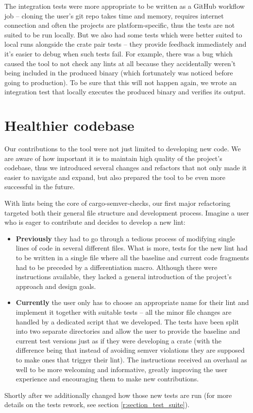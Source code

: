 \documentclass[licencjacka,en]{pracamgr}
\begin{document}
The integration tests were more appropriate to be written as a GitHub workflow job
-- cloning the user's git repo takes time and memory, requires internet connection
and often the projects are platform-specific,
thus the tests are not suited to be run locally.
But we also had some tests which were better suited to local runs alongside the crate pair tests
-- they provide feedback immediately and it's easier to debug when such tests fail.
For example, there was a bug which caused the tool to not check any lints at all
because they accidentally weren't being included in the produced binary
(which fortunately was noticed before going to production).
To be sure that this will not happen again, we wrote an integration test that
locally executes the produced binary and verifies its output.

\section{Healthier codebase}\label{r:section_healthier_codebase}

Our contributions to the tool were not just limited to developing new code. We are aware of
how important it is to maintain high quality of the project's codebase, thus we introduced
several changes and refactors that not only made it easier to navigate and expand, but also
prepared the tool to be even more successful in the future.

With lints being the core of cargo-semver-checks, our first major refactoring targeted both their
general file structure and development process. Imagine a user who is eager to contribute
and decides to develop a new lint:
\begin{itemize}
	\item \textbf{Previously} they had to go through a tedious process of modifying single lines
	of code in several different files. What is more, tests for the new lint had to be written
	in a single file where all the baseline and current code fragments had to be preceded by
	a differentiation macro. Although there were instructions available, they lacked
	a general introduction of the project's approach and design goals.

	\item \textbf{Currently} the user only has to choose an appropriate name for their lint
	and implement it together with suitable tests -- all the minor file changes are handled
	by a dedicated script that we developed. The tests have been split into two separate
	directories and allow the user to provide the baseline and current test versions just
	as if they were developing a crate (with the difference being that instead of avoiding semver violations
	they are supposed to make ones that trigger their lint). The instructions received an overhaul
	as well to be more welcoming and informative, greatly improving the user experience
	and encouraging them to make new contributions.
\end{itemize}
Shortly after we additionally changed how those new tests are run
(for more details on the tests rework, see section \ref{r:section_test_suite}).
\end{document}
